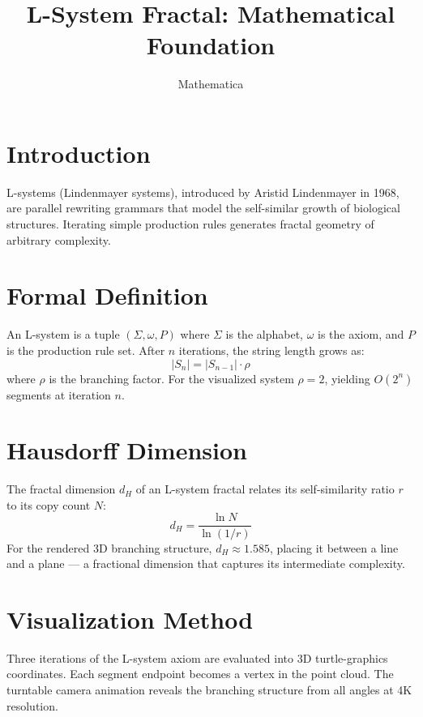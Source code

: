 \documentclass{article}
\title{L-System Fractal: Mathematical Foundation}
\author{Mathematica}
\begin{document}
\maketitle

\section{Introduction}

L-systems (Lindenmayer systems), introduced by Aristid Lindenmayer in
1968, are parallel rewriting grammars that model the self-similar growth
of biological structures. Iterating simple production rules generates
fractal geometry of arbitrary complexity.

\section{Formal Definition}

An L-system is a tuple $(\Sigma, \omega, P)$ where $\Sigma$ is the
alphabet, $\omega$ is the axiom, and $P$ is the production rule set.
After $n$ iterations, the string length grows as:
\[
  |S_n| = |S_{n-1}| \cdot \rho
\]
where $\rho$ is the branching factor. For the visualized system
$\rho = 2$, yielding $O(2^n)$ segments at iteration $n$.

\section{Hausdorff Dimension}

The fractal dimension $d_H$ of an L-system fractal relates its
self-similarity ratio $r$ to its copy count $N$:
\[
  d_H = \frac{\ln N}{\ln(1/r)}
\]
For the rendered 3D branching structure, $d_H \approx 1.585$, placing
it between a line and a plane --- a fractional dimension that captures
its intermediate complexity.

\section{Visualization Method}

Three iterations of the L-system axiom are evaluated into 3D
turtle-graphics coordinates. Each segment endpoint becomes a vertex in
the point cloud. The turntable camera animation reveals the branching
structure from all angles at 4K resolution.
\end{document}

